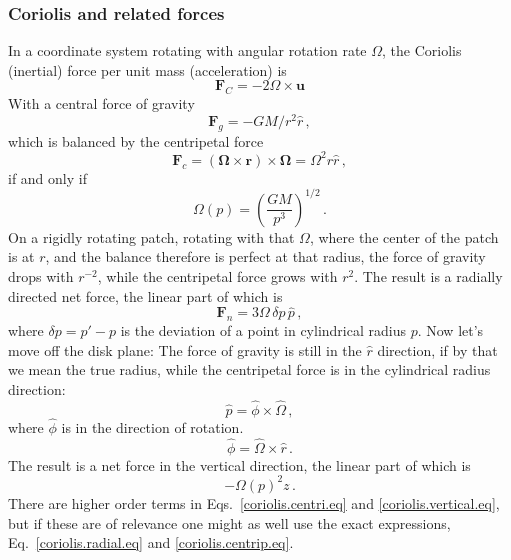 \documentclass[paper=a4,fontsize=11pt]{scrartcl}
\numberwithin{equation}{section}		%
\numberwithin{figure}{section}			%
\numberwithin{table}{section}				%
\begin{document}
\subsubsection{Coriolis and related forces}
In a coordinate system rotating with angular rotation rate $\Omega$, the Coriolis (inertial) force per unit mass (acceleration) is
\def\uu{\mathbf{u}}
\def\rr{\mathbf{r}}
\def\aa{\mathbf{a}}
\def\FF{\mathbf{F}}
\def\ff{\mathbf{f}}
\def\pp{\mathbf{p}}
\def\Om{\mathbf{\Omega}}
\begin{equation}
    \FF_C = -2 \Omega \times \uu
\end{equation}
With a central force of gravity
\def\rr{\mathbf{r}}
\begin{equation}\label{coriolis.radial.eq}
    \FF_g = - G M /r^2 \hat{r}\,,
\end{equation}
which is balanced by the centripetal force
\begin{equation}\label{coriolis.centrip.eq}
    \FF_c = (\Om\times\rr)\times\Om= \Omega^2 r \hat{r} \,,
\end{equation}
if and only if
\begin{equation}
    \Omega(p) = \left(\frac{G M}{p^3} \right)^{1/2} \,.
\end{equation}
On a rigidly rotating patch, rotating with that $\Omega$, where the center of the patch is at $r$, and the balance therefore is perfect at that radius, the force of gravity drops with $r^{-2}$, while the centripetal force grows with $r^2$.  The result is a radially directed net force, the linear part of which is
\begin{equation}\label{coriolis.centri.eq}
    \FF_n = 3\Omega \, \delta p \,\hat{p} \,,
\end{equation}
where $\delta p = p' - p$ is the deviation of a point in cylindrical radius $p$.
Now let's move off the disk plane:  The force of gravity is still in the $\hat{r}$ direction, if by that we mean the true radius, while the centripetal force is in the cylindrical radius direction:
\begin{equation}
    \hat{p} = \hat{\phi} \times \hat{\Omega}  \,,
\end{equation}
where $\hat{\phi}$ is in the direction of rotation.
\begin{equation}
    \hat{\phi} = \hat{\Omega} \times \hat{r}  \,.
\end{equation}
The result is a net force in the vertical direction, the linear part of which is
\begin{equation}\label{coriolis.vertical.eq}
    -\Omega(p)^2 z \,.
\end{equation}
There are higher order terms in Eqs.\ \ref{coriolis.centri.eq} and \ref{coriolis.vertical.eq}, but if these are of relevance one might as well use the exact expressions, Eq.\ \ref{coriolis.radial.eq} and \ref{coriolis.centrip.eq}.
\end{document}
